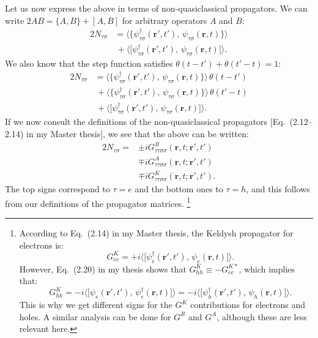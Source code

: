 Let us now express the above in terms of non-quasiclassical propagators.
We can write $2AB = \{A, B\} + [A, B]$ for arbitrary operators $A$ and $B$:
\begin{equation}
\begin{aligned}
  2N_{\tau\sigma}
  &=   \big\langle \big\{ \psi_{\tau\sigma}^\dagger(\bm{r}',t'),\, \psi_{\tau\sigma}^{\phantom{\dagger}}(\bm{r},t) \big\} \big\rangle \\
  &\,+ \big\langle \big[  \psi_{\tau\sigma}^\dagger(\bm{r}',t'),\, \psi_{\tau\sigma}^{\phantom{\dagger}}(\bm{r},t) \big]  \big\rangle. 
\end{aligned}
\end{equation}
We also know that the step function satisfies $\theta(t-t') + \theta(t'-t) = 1$:
\begin{equation}
\begin{aligned}
  2N_{\tau\sigma}
  &=   \big\langle \big\{ \psi_{\tau\sigma}^\dagger(\bm{r}',t'),\, \psi_{\tau\sigma}^{\phantom{\dagger}}(\bm{r},t) \big\} \big\rangle \,\theta(t-t') \\
  &\,+ \big\langle \big\{ \psi_{\tau\sigma}^\dagger(\bm{r}',t'),\, \psi_{\tau\sigma}^{\phantom{\dagger}}(\bm{r},t) \big\} \big\rangle \,\theta(t'-t) \\
  &\,+ \big\langle \big[  \psi_{\tau\sigma}^\dagger(\bm{r}',t'),\, \psi_{\tau\sigma}^{\phantom{\dagger}}(\bm{r},t) \big]  \big\rangle. 
\end{aligned}
\end{equation}
If we now consult the definitions of the non-quasiclassical propagators [Eq.~(2.12--2.14) in my Master thesis], we see that the above can be written:
\begin{equation}
\begin{aligned}
  2N_{\tau\sigma}
   =& \pm i G^R_{\tau\tau\sigma\sigma}(\bm{r}, t; \bm{r}', t') \\
    & \mp i G^A_{\tau\tau\sigma\sigma}(\bm{r}, t; \bm{r}', t') \\
    & \mp i G^K_{\tau\tau\sigma\sigma}(\bm{r}, t; \bm{r}', t') .
\end{aligned}
\end{equation}
The top signs correspond to $\tau = e$ and the bottom ones to $\tau = h$, and this follows from our definitions of the propagator matrices.%
\footnote{According to Eq.~(2.14) in my Master thesis, the Keldysh propagator for electrons is:
  \begin{equation} \quad G^K_{ee} = +i\big\langle \big[\psi_e^{\dagger}(\bm{r}',t'),\,\psi_e^{\phantom\dagger}(\bm{r},t) \big] \big\rangle. \end{equation}
  However, Eq.~(2.20) in my thesis shows that $G^K_{hh} \equiv -G^{K\ast}_{ee}$, which implies that:
  \begin{equation} \quad G^K_{hh} = -i\big\langle \big[\psi_e^{\phantom\dagger}(\bm{r}',t'),\,\psi_e^{\dagger}(\bm{r},t) \big] \big\rangle = -i\big\langle \big[\psi_h^{\dagger}(\bm{r}',t'),\,\psi_h^{\phantom\dagger}(\bm{r},t) \big] \big\rangle. \end{equation}
  This is why we get different signs for the $G^K$ contributions for electrons and holes. 
  A similar analysis can be done for $G^R$ and $G^A$, although these are less relevant here.}
